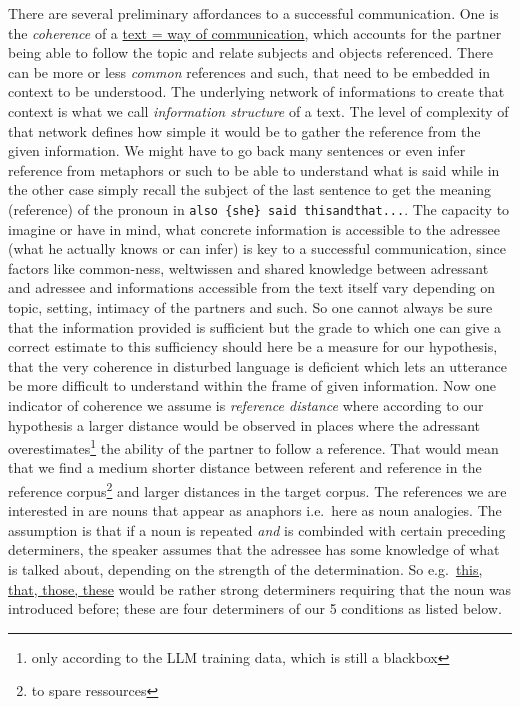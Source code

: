 \documentclass[
  12pt,
  oneside]{book}
\begin{document}
There are several preliminary affordances to a successful communication. One is the \emph{coherence} of a \href{}{text = way of communication}, which accounts for the partner being able to follow the topic and relate subjects and objects referenced. There can be more or less \emph{common} references and such, that need to be embedded in context to be understood. The underlying network of informations to create that context is what we call \emph{information structure} of a text. The level of complexity of that network defines how simple it would be to gather the reference from the given information. We might have to go back many sentences or even infer reference from metaphors or such to be able to understand what is said while in the other case simply recall the subject of the last sentence to get the meaning (reference) of the pronoun in \texttt{also\ \{she\}\ said\ thisandthat...}.
The capacity to imagine or have in mind, what concrete information is accessible to the adressee (what he actually knows or can infer) is key to a successful communication, since factors like common-ness, weltwissen and shared knowledge between adressant and adressee and informations accessible from the text itself vary depending on topic, setting, intimacy of the partners and such. So one cannot always be sure that the information provided is sufficient but the grade to which one can give a correct estimate to this sufficiency should here be a measure for our hypothesis, that the very coherence in disturbed language is deficient which lets an utterance be more difficult to understand within the frame of given information.
Now one indicator of coherence we assume is \emph{reference distance} where according to our hypothesis a larger distance would be observed in places where the adressant overestimates\footnote{only according to the LLM training data, which is still a blackbox} the ability of the partner to follow a reference. That would mean that we find a medium shorter distance between referent and reference in the reference corpus\footnote{to spare ressources} and larger distances in the target corpus. The references we are interested in are nouns that appear as anaphors i.e.~here as noun analogies. The assumption is that if a noun is repeated \emph{and} is combinded with certain preceding determiners, the speaker assumes that the adressee has some knowledge of what is talked about, depending on the strength of the determination. So e.g.~\href{}{this, that, those, these} would be rather strong determiners requiring that the noun was introduced before; these are four determiners of our 5 conditions as listed below.
\end{document}
